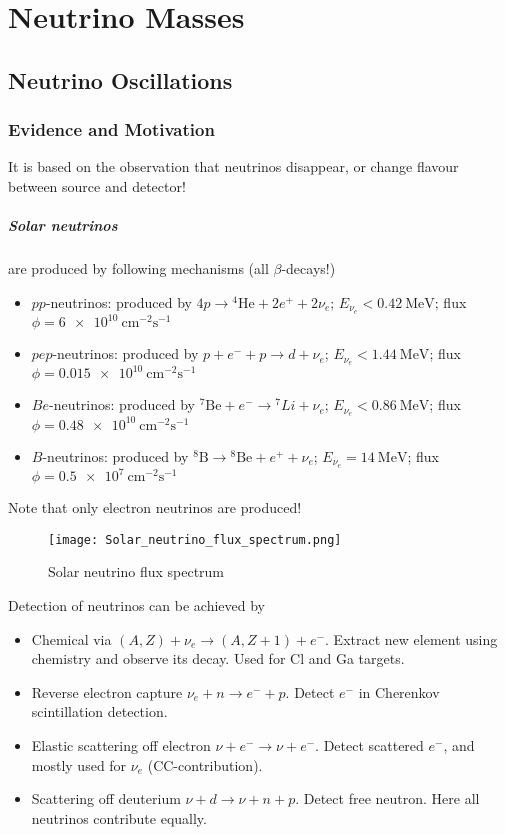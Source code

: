\chapter{Neutrino Masses}
\section{Neutrino Oscillations}
\subsection{Evidence and Motivation}
It is based on the observation that neutrinos disappear, or change flavour between source and detector!

\paragraph{Solar neutrinos} are produced by following mechanisms (all $\beta$-decays!)
\begin{itemize}
   \item $pp$-neutrinos: produced by $4p \rightarrow {}^4 \text{He} + 2 e^+ + 2 \nu_e$; $E_{\nu_e} < \SI{0.42}{\mega \eV}$; flux $\phi= \SI{6e10}{\cm\tothe{-2}\s\tothe{-1}}$
   \item $pep$-neutrinos: produced by $p+e^-+p \rightarrow d + \nu_e$; $E_{\nu_e} < \SI{1.44}{\mega \eV}$; flux $\phi=\SI{0.015e10}{\cm\tothe{-2}\s\tothe{-1}}$
   \item $Be$-neutrinos: produced by ${}^{7}\text{Be} + e^- \rightarrow {}^7 Li + \nu_e$; $E_{\nu_e} < \SI{0.86}{\mega \eV}$; flux $\phi=\SI{0.48e10}{\cm\tothe{-2}\s\tothe{-1}}$
   \item $B$-neutrinos: produced by ${}^8 \text{B} \rightarrow {}^8 \text{Be} + e^+ + \nu_e$; $E_{\nu_e} = \SI{14}{\mega \eV}$; flux $\phi=\SI{0.5e7}{\cm\tothe{-2}\s\tothe{-1}}$
\end{itemize}
Note that only electron neutrinos are produced!

\begin{figure}[htpb]
   \centering
   \texttt{[image: Solar\_neutrino\_flux\_spectrum.png]}
   \caption{Solar neutrino flux spectrum\cite{wiki:solarNu}}%
   \label{fig:}
\end{figure}

Detection of neutrinos can be achieved by
\begin{itemize}
   \item Chemical via $(A,Z) + \nu_e \rightarrow (A,Z+1) + e^-$. Extract new element using chemistry and observe its decay. Used for Cl and Ga targets.
   \item Reverse electron capture $\nu_e + n \rightarrow e^- + p $. Detect $e^-$ in Cherenkov scintillation detection.
   \item Elastic scattering off electron $\nu + e^- \rightarrow \nu + e^-$. Detect scattered $e^-$, and mostly used for $\nu_e$ (CC-contribution).
   \item Scattering off deuterium $\nu + d \rightarrow \nu + n + p$. Detect free neutron. Here all neutrinos contribute equally. 
\end{itemize}

